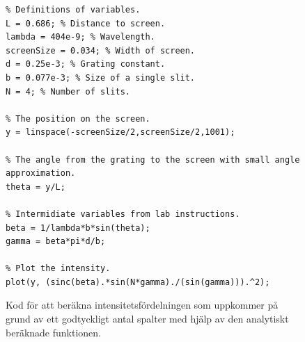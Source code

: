 \documentclass[a4paper]{article}
\begin{document}
  \begin{figure}[ht]
  \centering
  \begin{lstlisting}
% Definitions of variables.
L = 0.686; % Distance to screen.
lambda = 404e-9; % Wavelength.
screenSize = 0.034; % Width of screen.
d = 0.25e-3; % Grating constant.
b = 0.077e-3; % Size of a single slit.
N = 4; % Number of slits.

% The position on the screen.
y = linspace(-screenSize/2,screenSize/2,1001);

% The angle from the grating to the screen with small angle approximation.
theta = y/L;

% Intermidiate variables from lab instructions.
beta = 1/lambda*b*sin(theta);
gamma = beta*pi*d/b;

% Plot the intensity.
plot(y, (sinc(beta).*sin(N*gamma)./(sin(gamma))).^2);
  \end{lstlisting}
  \caption{Kod för att beräkna intensitetsfördelningen som uppkommer på grund av ett godtyckligt antal spalter med hjälp av den analytiskt beräknade funktionen.}
  \end{figure}

\FloatBarrier
\end{document}

